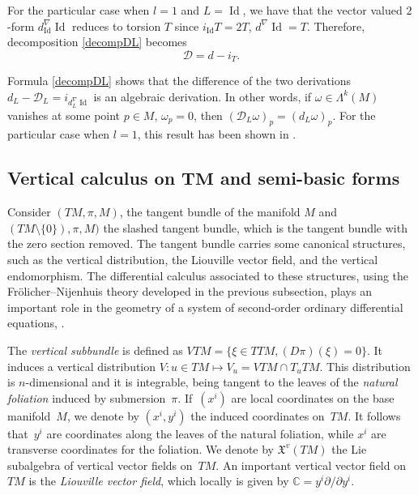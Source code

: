 \documentclass[pdftex]{sigma}
\numberwithin{equation}{section}
\begin{document}
For the particular case when $l=1$ and $L=\operatorname{Id}$, we have that
the vector valued $2$-form
$d_{\operatorname{Id}}^{\nabla}\operatorname{Id}$ reduces to
torsion $T$ since $i_{\operatorname{Id}}T=2T$,
$d^{\nabla}\operatorname{Id}=T$. Therefore, decomposition
\eqref{decompDL} becomes
\[ %
{\mathcal D}=d- i_T.
\]
\begin{Remark}
Formula \eqref{decompDL} shows that the dif\/ference of the two
derivations $d_L-{\mathcal
D}_L=i_{d^{\nabla}_L\operatorname{Id}}$ is an algebraic derivation.
In other words, if $\omega \in \Lambda^k(M)$ vanishes at some
point $p\in M$, $\omega_p=0$, then $({\mathcal
D}_L\omega)_p=(d_L\omega)_p$. For the particular case when $l=1$, this result has been
shown in \cite[Proposition~2.5]{grifone00}.
\end{Remark}



\subsection[Vertical calculus on $TM$ and semi-basic forms]{Vertical calculus on $\boldsymbol{TM}$ and semi-basic forms} \label{subsec:vcalc}

Consider $(TM, \pi, M)$, the tangent bundle of the manifold $M$
and $(TM\setminus\{0\}), \pi, M)$ the slashed tangent bundle, which is
the tangent bundle with the zero
section removed. The tangent bundle carries some canonical structures, such
as the vertical distribution, the Liouville vector f\/ield, and the
vertical endomorphism. The dif\/ferential calculus associated to
these structures, using the Fr\"olicher--Nijenhuis theory developed in
the previous subsection, plays an important role in the geometry of a
system of second-order ordinary dif\/ferential equations,
\cite{ bcd10, bucataru09, grifone72, grifone00, klein68, deleon89, miron94}.

The \emph{vertical subbundle} is def\/ined as $VTM=\{\xi \in TTM,
(D\pi)(\xi)=0\}$. It induces a vertical distribution $V: u\in TM
\mapsto V_u=VTM\cap T_uTM$. This distribution is $n$-dimensional
and it is integrable, being tangent to the leaves of the \emph{natural
foliation} induced by submersion~$\pi$. If~$(x^i)$ are local coordinates on the base
manifold~$M$, we denote by $(x^i, y^i)$ the induced coordinates on~$TM$. It follows that~$y^i$ are coordinates along the leaves of the
natural foliation, while $x^i$ are transverse coordinates for the
foliation. We denote by ${\mathfrak X}^v(TM)$ the Lie subalgebra of vertical vector f\/ields on~$TM$. An
important vertical vector f\/ield on $TM$ is the \emph{Liouville vector
field}, which locally is given by
$\mathbb{C}=y^i{\partial}/{\partial y^i}.$
\end{document}

